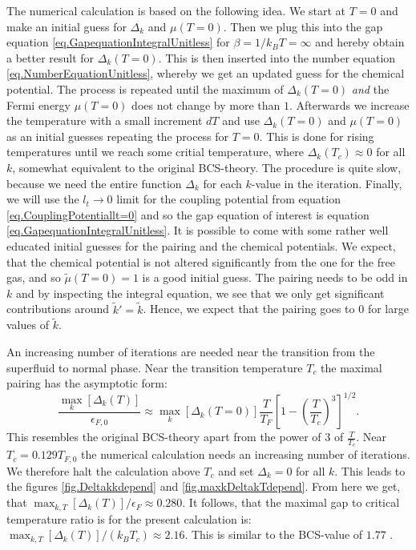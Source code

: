 The numerical calculation is based on the following idea. We start at $T = 0$ and make an initial guess for $\Delta_k$ and $\mu(T=0)$. Then we plug this into the gap equation \eqref{eq.GapequationIntegralUnitless} for $\beta = 1/k_BT = \infty$ and hereby obtain a better result for $\Delta_k(T=0)$. This is then inserted into the number equation \eqref{eq.NumberEquationUnitless}, whereby we get an updated guess for the chemical potential. The process is repeated until the maximum of $\Delta_k(T=0)$ \textit{and} the Fermi energy $\mu( T=0 )$ does not change by more than $1$\textperthousand. Afterwards we increase the temperature with a small increment $dT$ and use $\Delta_k(T=0)$ and $\mu( T=0 )$ as an initial guesses repeating the process for $T=0$. This is done for rising temperatures until we reach some critial temperature, where $\Delta_k(T_c)\approx 0$ for all $k$, somewhat equivalent to the original BCS-theory\cite{Tinkham,LandauStatPhys2,PlischkeStatPhys}. The procedure is quite slow, because we need the entire function $\Delta_k$ for each $k$-value in the iteration. Finally, we will use the $l_t \to 0$ limit for the coupling potential from equation \eqref{eq.CouplingPotentiallt=0} and so the gap equation of interest is equation \eqref{eq.GapequationIntegralUnitless}. It is possible to come with some rather well educated initial guesses for the pairing and the chemical potentials. We expect, that the chemical potential is not altered significantly from the one for the free gas, and so $\tilde{\mu}(T = 0) = 1$ is a good initial guess. The pairing needs to be odd in $k$ and by inspecting the integral equation, we see that we only get significant contributions around $\tilde{k}' = \tilde{k}$. Hence, we expect that the pairing goes to 0 for large values of $\tilde{k}$.  

An increasing number of iterations are needed near the transition from the superfluid to normal phase. Near the transition temperature $T_c$ the maximal pairing has the asymptotic form:
\begin{equation}
\frac{\max_{k}[\Delta_k(T)]}{\epsilon_{F,0}} \approx \max_k[\Delta_{k}(T=0)]\frac{T}{T_F}\left[1 - \left(\frac{T}{T_c}\right)^3\right]^{1/2}. 
\label{eq.maxpairingasymp}
\end{equation}
This resembles the original BCS-theory apart from the power of 3 of $\frac{T}{T_c}$. Near $T_c = 0.129 T_{F,0}$ the numerical calculation needs an increasing number of iterations. We therefore halt the calculation above $T_c$ and set $\Delta_k = 0$ for all $k$. This leads to the figures \ref{fig.Deltakkdepend} and \ref{fig.maxkDeltakTdepend}. From here we get, that $\max_{k,T}[\Delta_k(T)]/\epsilon_F \approx 0.280$. It follows, that the maximal gap to critical temperature ratio is for the present calculation is: $\max_{k,T}[\Delta_k(T)]/(k_B T_c) \approx 2.16$. This is similar to the BCS-value of $1.77$ \cite{BruusFlensberg}.  

